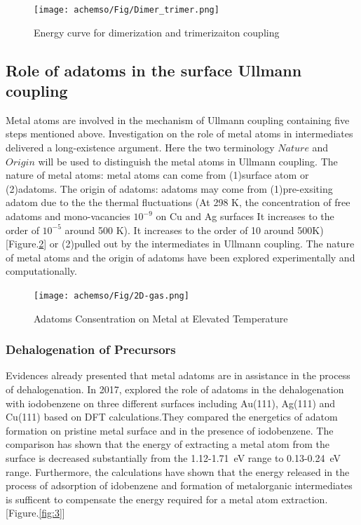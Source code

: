 \documentclass[journal=jacsat,manuscript=article]{achemso}
\begin{document}
\begin{figure}[ht]
\centering
\texttt{[image: achemso/Fig/Dimer\_trimer.png]}
\caption{Energy curve for dimerization and trimerizaiton coupling}
\label{fig:dimer}
\end{figure}


\subsection{Role of adatoms in the surface Ullmann coupling} 
Metal atoms are involved in the mechanism of Ullmann coupling containing five steps mentioned above. Investigation on the role of metal atoms in intermediates delivered a long-existence argument.
Here the two terminology $Nature$ and $Origin$ will be used to distinguish the metal atoms in Ullmann coupling.
The nature of metal atoms: metal atoms can come from (1)surface atom or (2)adatoms.
The origin of adatoms: adatoms may come from (1)pre-exsiting adatom due to the the thermal fluctuations (At 298 K, the concentration of free adatoms and mono-vacancies $10^{-9}$ on Cu and Ag surfaces It increases to the order of $10^{-5}$ around 500 K). It increases to the order of 10 around 500K)[Figure.\ref{fig:2D-gas}] or (2)pulled out by the intermediates in Ullmann coupling. The nature of metal atoms and the origin of adatoms have been explored experimentally and computationally.

\begin{figure}[ht]
\centering
\texttt{[image: achemso/Fig/2D-gas.png]}
\caption{Adatoms Consentration on Metal at Elevated Temperature}
\label{fig:2D-gas}
\end{figure}


\subsubsection{Dehalogenation of Precursors}
Evidences already presented that metal adatoms are in assistance in the process of dehalogenation. In 2017, \citeauthor{chemeurope2017}\cite{chemeurope2017} explored the role of adatoms in the dehalogenation with iodobenzene on three different surfaces including Au(111), Ag(111) and Cu(111) based on DFT calculations.They compared the energetics of adatom formation on pristine metal surface and in the presence of iodobenzene. The comparison has shown that the energy of extracting a metal atom from the surface is decreased substantially from the 1.12-1.71~eV range to 0.13-0.24~eV range. Furthermore, the calculations have shown that the energy released in the process of adsorption of idobenzene and formation of metalorganic intermediates is sufficent to compensate the energy required for a metal atom extraction. [Figure.\ref{fig:3}]
\end{document}
